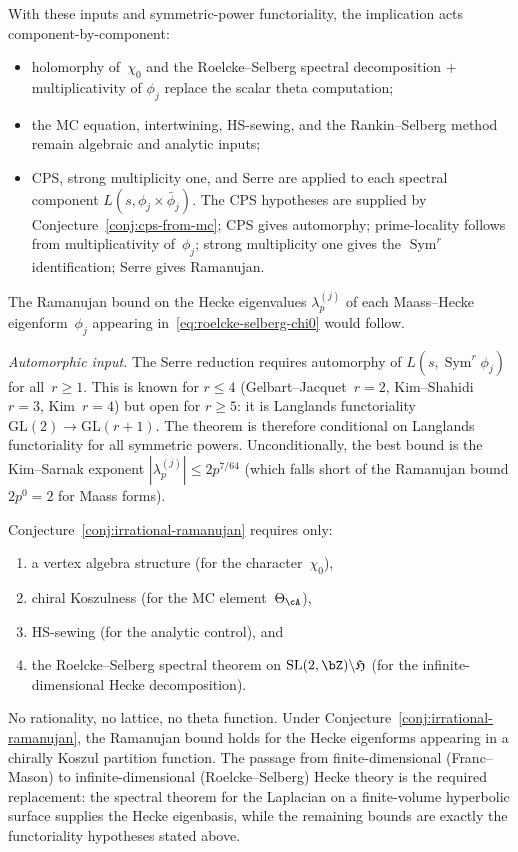 \begin{remark}
\smallskip
With these inputs and symmetric-power functoriality, the implication
acts component-by-component:
\begin{itemize}[nosep]
\item holomorphy of~$\chi_0$ and the
 Roelcke--Selberg spectral decomposition $+$
 multiplicativity of $\phi_j$ replace the scalar theta
 computation;
\item the MC equation, intertwining, HS-sewing, and the
 Rankin--Selberg method remain algebraic and analytic inputs;
\item CPS, strong multiplicity one, and Serre are applied to each
 spectral component $L(s, \phi_j \times \bar\phi_j)$. The CPS
 hypotheses are supplied by Conjecture~\ref{conj:cps-from-mc};
 CPS gives automorphy; prime-locality follows from
 multiplicativity of~$\phi_j$; strong multiplicity one
 gives the $\operatorname{Sym}^r$ identification; Serre
 gives Ramanujan.
\end{itemize}
The Ramanujan bound on the Hecke eigenvalues
$\lambda_p^{(j)}$ of each Maass--Hecke eigenform~$\phi_j$
appearing in~\eqref{eq:roelcke-selberg-chi0} would follow.

\emph{Automorphic input.} The Serre reduction
requires automorphy of $L(s,\operatorname{Sym}^r\phi_j)$ for
all~$r \geq 1$. This is known for $r \leq 4$
(Gelbart--Jacquet~$r{=}2$, Kim--Shahidi~$r{=}3$, Kim~$r{=}4$) but open
for $r \geq 5$: it is Langlands functoriality
$\mathrm{GL}(2) \to \mathrm{GL}(r{+}1)$. The theorem is
therefore conditional on Langlands functoriality for all
symmetric powers. Unconditionally, the best bound is the
Kim--Sarnak exponent
$|\lambda_p^{(j)}| \leq 2p^{7/64}$
(which falls short of the Ramanujan bound $2p^0 = 2$
for Maass forms).
\end{remark}

\begin{remark}%
\label{rem:universal-ramanujan}%
%
Conjecture~\ref{conj:irrational-ramanujan} requires only:
\begin{enumerate}[label=\textup{(\alph*)}]
\item a vertex algebra structure (for the character~$\chi_0$),
\item chiral Koszulness (for the MC element~$\Theta_\cA$),
\item HS-sewing (for the analytic control), and
\item the Roelcke--Selberg spectral theorem on
 $\mathrm{SL}(2,\bZ)\backslash\mathfrak{H}$
 (for the infinite-dimensional Hecke decomposition).
\end{enumerate}
No rationality, no lattice, no theta function.
Under Conjecture~\ref{conj:irrational-ramanujan}, the Ramanujan
bound holds for the Hecke eigenforms appearing in a chirally Koszul
partition function.
The passage from finite-dimensional
(Franc--Mason) to infinite-dimensional (Roelcke--Selberg)
Hecke theory is the required replacement: the spectral theorem for
the Laplacian on a finite-volume hyperbolic surface supplies the
Hecke eigenbasis, while the remaining bounds are exactly the
functoriality hypotheses stated above.
\end{remark}


